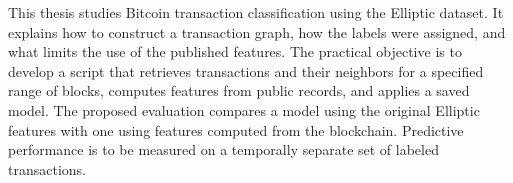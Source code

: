 This thesis studies Bitcoin transaction classification using
the Elliptic dataset. It explains how to construct a transaction
graph, how the labels were assigned, and what limits the use of the
published features. The practical objective is to develop a script
that retrieves transactions and their neighbors for a specified
range of blocks, computes features from public records, and
applies a saved model. The proposed evaluation compares a model
using the original Elliptic features with one using features
computed from the blockchain. Predictive performance is to be
measured on a temporally separate set of labeled transactions.
